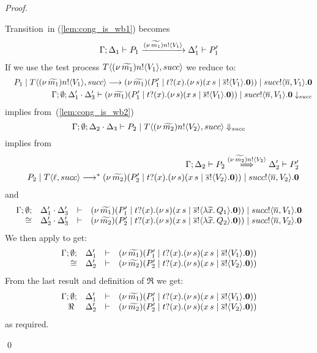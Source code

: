 \begin{proof}
\begin{enumerate}
\begin{enumerate}[i.]
						\noi Transition~in (\ref{lem:cong_is_wb1}) becomes
						\begin{eqnarray}
							\Gamma; \Delta_1 \vdash P_1 \xrightarrow{(\nu\, \widetilde{m_1}) n ! \langle V_1 \rangle} \Delta_1' \vdash P_1'
							\label{lem:cong_is_wb3}
						\end{eqnarray}
						\noi If we use the test process $T\langle (\nu\, \widetilde{m_1}) n ! \langle V_1 \rangle, succ \rangle$ we reduce to:%
						\begin{eqnarray*}
							&& P_1 \;|\; T\langle (\nu\, \widetilde{m_1}) n ! \langle V_1 \rangle, succ \rangle
							\longrightarrow
							(\nu\, \widetilde{m_1})(P_1' \;|\; t ? (x) . (\nu\, s)(x\, {s} \;|\; \overline{s} ! \langle V_1 \rangle . \mathbf{0})) \;|\; succ ! \langle \overline{n}, V_1 \rangle . \mathbf{0} \\
							&& \Gamma; \emptyset; \Delta_1' \cdot \Delta_3' \vdash (\nu\, \widetilde{m_1})(P_1' \;|\; t ? (x) . (\nu\, s)(x\, {s} \;|\; \overline{s} ! \langle V_1 \rangle . \mathbf{0})) \;|\; succ ! \langle \overline{n}, V_1 \rangle . \mathbf{0} \downarrow_{succ}
						\end{eqnarray*}
						\noi implies from~(\ref{lem:cong_is_wb2})
						\[
							\Gamma; \emptyset; \Delta_2 \cdot \Delta_3 \vdash P_2 \;|\; T\langle (\nu\, \widetilde{m_2}) n ! \langle V_2 \rangle, succ \rangle \Downarrow_{succ}
						\]
						\noi implies from 
						\begin{eqnarray}
							&& \Gamma; \Delta_2 \vdash P_2 \stackrel{(\nu\, \widetilde{m_2}) n ! \langle V_2 \rangle}{\Longrightarrow} \Delta_2' \vdash P_2'
							\label{lem:cong_is_wb4}\\
							&& P_2 \;|\; T \langle \ell, succ \rangle \longrightarrow^{*} (\nu\, \widetilde{m_2})(P_2' \;|\; t ? (x) . (\nu\, s)(x\, {s} \;|\; \overline{s} ! \langle V_2 \rangle . \mathbf{0})) \;|\; succ ! \langle \overline{n}, V_2 \rangle . \mathbf{0} \nonumber
						\end{eqnarray}
						\noi and
						\[
							\begin{array}{rcll} \Gamma; \emptyset; &\Delta_1' \cdot \Delta_3'& \vdash& (\nu\, \widetilde{m_1})(P_1' \;|\; t ? (x) . (\nu\, s)(x\, {s} \;|\; \overline{s} ! \langle \lambda \widetilde{x}.\,Q_1 \rangle . \mathbf{0})) \;|\; succ ! \langle \overline{n}, V_1 \rangle . \mathbf{0}\\ \cong &\Delta_2' \cdot \Delta_3'& \vdash &  (\nu\, \widetilde{m_2})(P_2' \;|\; t ? (x) . (\nu\, s)(x\, {s} \;|\; \overline{s} ! \langle \lambda \widetilde{x}.\,Q_2 \rangle . \mathbf{0})) \;|\; succ ! \langle \overline{n}, V_2 \rangle . \mathbf{0} \end{array}
						\]
						\noi We then apply  to get:
						\[
							\begin{array}{rcll} \Gamma; \emptyset; &\Delta_1'& \vdash& (\nu\, \widetilde{m_1})(P_1' \;|\; t ? (x) . (\nu\, s)(x\, {s} \;|\; \overline{s} ! \langle V_1 \rangle . \mathbf{0}))\\ \cong &\Delta_2'& \vdash &  (\nu\, \widetilde{m_2})(P_2' \;|\; t ? (x) . (\nu\, s)(x\, {s} \;|\; \overline{s} ! \langle V_2 \rangle . \mathbf{0})) \end{array}
						\]
						\noi From the last result and definition of $\Re$ we get:
						\[
							\begin{array}{rcll} \Gamma; \emptyset; &\Delta_1'& \vdash& (\nu\, \widetilde{m_1})(P_1' \;|\; t ? (x) . (\nu\, s)(x\, {s} \;|\; \overline{s} ! \langle V_1 \rangle . \mathbf{0}))\\ \ \Re\  &\Delta_2'& \vdash &  (\nu\, \widetilde{m_2})(P_2' \;|\; t ? (x) . (\nu\, s)(x\, {s} \;|\; \overline{s} ! \langle V_2 \rangle . \mathbf{0})) \end{array}
						\]
						\noi as required.

%
			\end{enumerate}
\end{enumerate}
	\qed
\end{proof}

